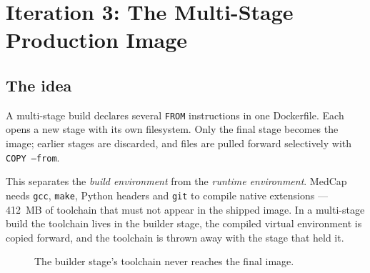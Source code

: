 \documentclass[10pt,a4paper]{article}
\newcommand{\cmd}[1]{\texttt{\small #1}}
\begin{document}
\section{Iteration 3: The Multi-Stage Production Image}

\subsection{The idea}

A multi-stage build declares several \texttt{FROM} instructions in one
Dockerfile. Each opens a new stage with its own filesystem. Only the
final stage becomes the image; earlier stages are discarded, and files
are pulled forward selectively with \cmd{COPY --from}.

This separates the \emph{build environment} from the \emph{runtime
environment}. MedCap needs \texttt{gcc}, \texttt{make}, Python headers
and \texttt{git} to compile native extensions --- 412~MB of toolchain
that must not appear in the shipped image. In a multi-stage build the
toolchain lives in the builder stage, the compiled virtual environment
is copied forward, and the toolchain is thrown away with the stage that
held it.

\begin{figure}[h]
\centering
{}
\caption{The builder stage's toolchain never reaches the final image.}
\end{figure}
\end{document}
